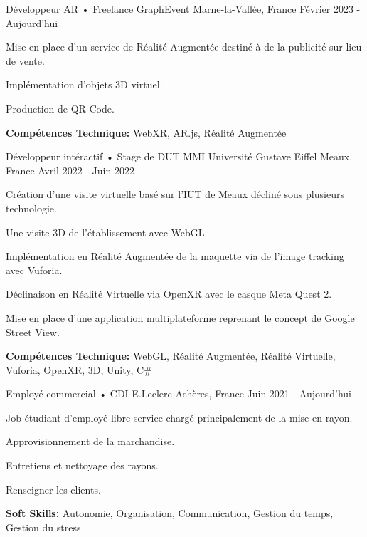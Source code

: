 \begin{cventries}
    \cventry
    {Développeur AR • Freelance} %
    {GraphEvent} %
    {Marne-la-Vallée, France} %
    {Février 2023 - Aujourd'hui} %
    {
      \begin{cvitems} %
        \item {Mise en place d'un service de Réalité Augmentée destiné à de la publicité sur lieu de vente.}
        \item {Implémentation d'objets 3D virtuel.}
        \item{Production de QR Code.}
        \item {\textbf{Compétences Technique:} WebXR, AR.js, Réalité Augmentée}
      \end{cvitems}
    }
    \cventry
    {Développeur intéractif • Stage de DUT MMI} %
    {Université Gustave Eiffel} %
    {Meaux, France} %
    {Avril 2022 - Juin 2022} %
    {
      \begin{cvitems} %
        \item {Création d'une visite virtuelle basé sur l'IUT de Meaux décliné sous plusieurs technologie.}
        \item {Une visite 3D de l'établissement avec WebGL.}
        \item {Implémentation en Réalité Augmentée de la maquette via de l'image tracking avec Vuforia.}
        \item {Déclinaison en Réalité Virtuelle via OpenXR avec le casque Meta Quest 2.}
        \item {Mise en place d'une application multiplateforme reprenant le concept de Google Street View.}
        \item {\textbf{Compétences Technique:} WebGL, Réalité Augmentée, Réalité Virtuelle, Vuforia, OpenXR, 3D, Unity, C\#}
      \end{cvitems}
    }

    
    \cventry
    {Employé commercial • CDI} %
    {E.Leclerc} %
    {Achères, France} %
    {Juin 2021 - Aujourd'hui} %
    {
      \begin{cvitems} %
        \item {Job étudiant d'employé libre-service chargé principalement de la mise en rayon.}
        \item{Approvisionnement de la marchandise.}
        \item {Entretiens et nettoyage des rayons.}
        \item {Renseigner les clients.}
        \item {\textbf{Soft Skills:} Autonomie, Organisation, Communication, Gestion du temps, Gestion du stress}
      \end{cvitems}
    } 

\end{cventries} 

